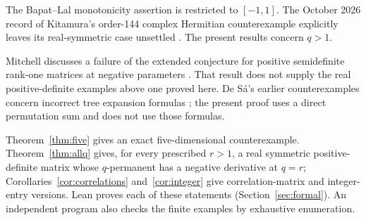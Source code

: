 \documentclass[11pt]{article}
\begin{document}
The Bapat--Lal monotonicity assertion is restricted to $[-1,1]$. The October 2026 record of Kitamura's order-144 complex Hermitian counterexample explicitly leaves its real-symmetric case unsettled \cite{kitamura}. The present results concern $q>1$.

Mitchell discusses a failure of the extended conjecture for positive
semidefinite rank-one matrices at negative parameters \cite{mitchell}.
That result does not supply the real positive-definite examples above one
proved here. De S\'a's earlier counterexamples concern incorrect tree
expansion formulas \cite{desa}; the present proof uses a direct permutation
sum and does not use those formulas.

Theorem~\ref{thm:five} gives an exact five-dimensional counterexample.
Theorem~\ref{thm:allq} gives, for every prescribed $r>1$, a real symmetric
positive-definite matrix whose $q$-permanent has a negative derivative at
$q=r$; Corollaries~\ref{cor:correlations} and~\ref{cor:integer} give
correlation-matrix and integer-entry versions. Lean proves each of these
statements (Section~\ref{sec:formal}). An independent program also checks
the finite examples by exhaustive enumeration.
\end{document}
